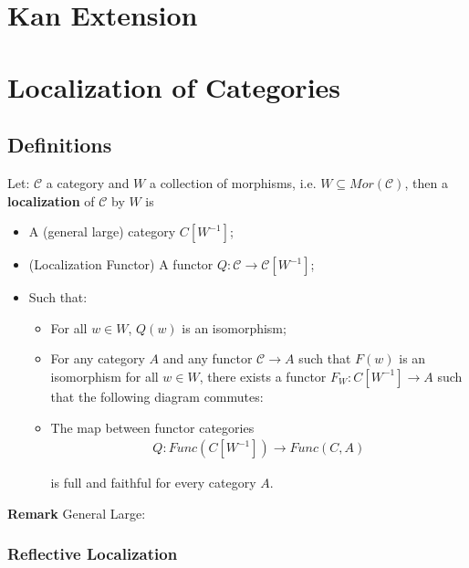 \documentclass[total.tex]{subfiles}
\begin{document}
	\chapter{Kan Extension}
	\chapter{Localization of Categories}
		\section{Definitions}
			\begin{Def}
				Let: $\mathcal{C}$ a category and $W$ a collection of morphisms, i.e. $W\subseteq Mor(\mathcal{C})$, then a \textbf{localization} of $\mathcal{C}$ by $W$ is 
				\begin{itemize}
					\item A (general large) category $C[W^{-1}]$;
					\item (Localization Functor) A functor $Q:\mathcal{C}\rightarrow \mathcal{C}[W^{-1}]$;
					\item Such that:
					\begin{itemize}
						\item For all $w\in W$, $Q(w)$ is an isomorphism;
						\item For any category $A$ and any functor $\mathcal{C}\rightarrow A$ such that $F(w)$ is an isomorphism for all $w\in W$, there exists a functor $F_W:C[W^{-1}]\rightarrow A$ such that the following diagram commutes:
						\begin{center}
						\end{center}
						\item The map between functor categories
						\begin{gather*}
							Q:Func(C[W^{-1}])\rightarrow Func(C,A)
						\end{gather*}
						
						is full and faithful for every category $A$.
					\end{itemize}
				\end{itemize}
			\end{Def}
			
			\textbf{Remark} General Large:
			
			\subsection{Reflective Localization}
\end{document}

